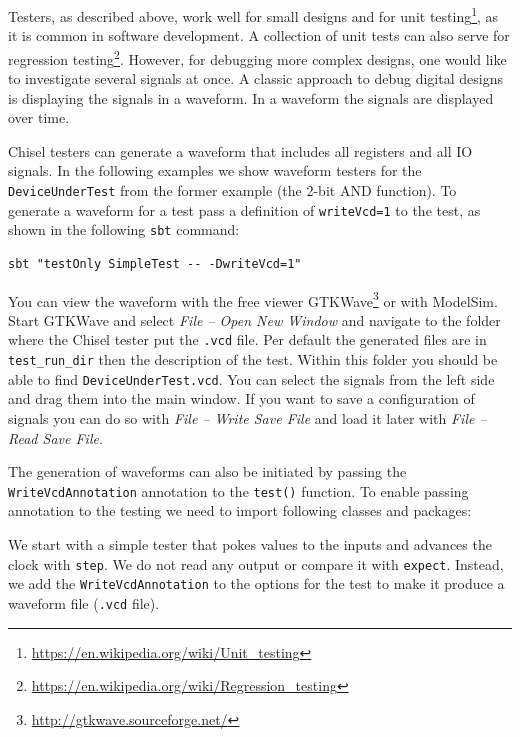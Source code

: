 \documentclass[%
    10pt,
    headinclude, footexclude,
    openright, %
    notitlepage,
    cleardoubleempty,
    headsepline,
    pointlessnumbers,
    bibtotoc, idxtotoc,
    ]{scrbook}
\newcommand{\code}[1]{{\small{\texttt{#1}}}}
\newcommand{\myref}[2]{\href{#1}{#2}}
\renewcommand{\myref}[2]{{#2}{\footnote{\url{#1}}}}
\begin{document}
Testers, as described above, work well for small designs and for 
\myref{https://en.wikipedia.org/wiki/Unit_testing}{unit testing}, as it is common in
software development. A collection of unit tests can also serve for
\myref{https://en.wikipedia.org/wiki/Regression_testing}{regression testing}. However, 
for debugging more complex designs, one would like to investigate several signals at 
once. A classic approach to debug digital designs is displaying the signals in a 
waveform. In a waveform the signals are displayed over time.

\noindent Chisel testers can generate a waveform that includes all registers and all 
IO signals. In the following examples we show waveform testers for the 
\code{DeviceUnderTest} from the former example (the 2-bit AND function).
To generate a waveform for a test pass a definition of \code{writeVcd=1} to
the test, as shown in the following \code{sbt} command:

\begin{verbatim}
sbt "testOnly SimpleTest -- -DwriteVcd=1"
\end{verbatim}

You can view the waveform with the free viewer
\myref{http://gtkwave.sourceforge.net/}{GTKWave} or with ModelSim.
Start GTKWave and select \emph{File -- Open New Window} and navigate to the
folder where the Chisel tester put the \code{.vcd} file. Per default the generated files
are in \code{test\_run\_dir} then the description of the test.
Within this folder you should be able to find \code{DeviceUnderTest.vcd}.
You can select the signals from the left side and drag them into the main window.
If you want to save a configuration of signals you can do so with \emph{File -- Write Save File}
and load it later with \emph{File -- Read Save File}. 

The generation of waveforms can also be initiated by passing the \code{WriteVcdAnnotation}
annotation to the \code{test()} function.
To enable passing annotation to the testing we need to import following classes and packages:


We start with a simple tester that pokes values to the inputs and advances
the clock with \code{step}. We do not read any output or compare it with \code{expect}.
Instead, we add the \code{WriteVcdAnnotation} to the options for the 
test to make it produce a waveform file (\code{.vcd} file).


\end{document}
